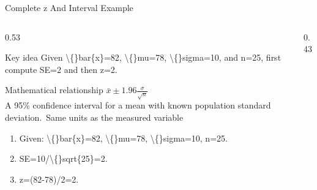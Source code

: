 \documentclass[aspectratio=169]{beamer}
\begin{document}
\begin{frame}{Complete z And Interval Example}
\begin{columns}[T]
\begin{column}{0.53\textwidth}
\begin{alertblock}{Key idea}
\small Given \textbackslash\{\}bar\{x\}=82, \textbackslash\{\}mu=78, \textbackslash\{\}sigma=10, and n=25, first compute SE=2 and then z=2.
\end{alertblock}

\begin{block}{Mathematical relationship}
\centering\Large $\bar{x}\pm1.96\frac{\sigma}{\sqrt{n}}$\\[0.12cm]
\small A 95\% confidence interval for a mean with known population standard deviation.\ Same units as the measured variable
\end{block}

\begin{enumerate}
\small
\item Given: \textbackslash\{\}bar\{x\}=82, \textbackslash\{\}mu=78, \textbackslash\{\}sigma=10, n=25.
\item SE=10/\textbackslash\{\}sqrt\{25\}=2.
\item z=(82-78)/2=2.
\end{enumerate}
\end{column}
\begin{column}{0.43\textwidth}
\begin{center}\end{center}
\end{column}
\end{columns}

\end{frame}
\end{document}

